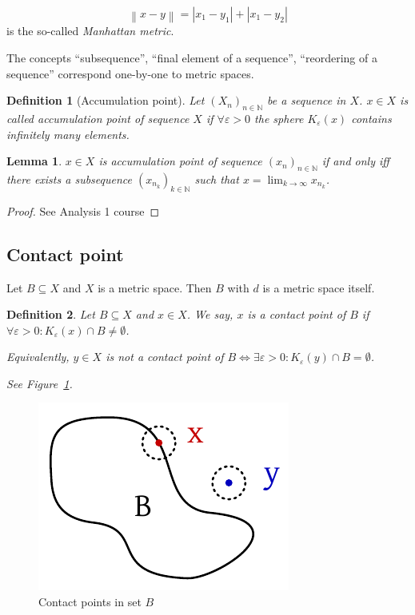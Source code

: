 \documentclass{article}
\newtheorem{definition}{Definition}  \numberwithin{definition}{section}
\newtheorem{lemma}{Lemma}  \numberwithin{lemma}{section}
\newcommand{\norm}[1]{\left\|#1\right\|}
\newcommand{\card}[1]{\left|#1\right|}
\begin{document}
\[ \norm{x - y} = \card{x_1 - y_1} + \card{x_1 - y_2} \]
is the so-called \emph{Manhattan metric}.

The concepts \enquote{subsequence}, \enquote{final element of a sequence}, \enquote{reordering of a sequence} correspond one-by-one to metric spaces.

\begin{definition}[Accumulation point]
  Let $(X_n)_{n\in\mathbb N}$ be a sequence in $X$. $x \in X$ is called \emph{accumulation point of sequence $X$}
  if $\forall \varepsilon > 0$ the sphere $K_{\varepsilon}(x)$ contains infinitely many elements.
\end{definition}

\begin{lemma}
  $x \in X$ is accumulation point of sequence $(x_n)_{n\in\mathbb N}$
  if and only iff there exists a subsequence $(x_{n_k})_{k \in \mathbb N}$ such that
  $x = \lim_{k\to\infty} x_{n_k}$.
\end{lemma}

\begin{proof}
  See Analysis 1 course
\end{proof}

\subsection{Contact point}

Let $B \subseteq X$ and $X$ is a metric space. Then $B$ with $d$ is a metric space itself.

\begin{definition}
  Let $B \subseteq X$ and $x \in X$. We say, $x$ is a \emph{contact point of $B$}
  if $\forall \varepsilon > 0: K_{\varepsilon}(x) \cap B \neq \emptyset$.

  Equivalently, $y \in X$ is not a contact point of $B \iff \exists \varepsilon > 0: K_{\varepsilon}(y) \cap B = \emptyset$.

  See Figure~\ref{img:cp}.
\end{definition}

\begin{figure}
  \begin{center}
    \includegraphics{img/03_contact_point.pdf}
    \caption{Contact points in set $B$}
    \label{img:cp}
  \end{center}
\end{figure}
\end{document}

